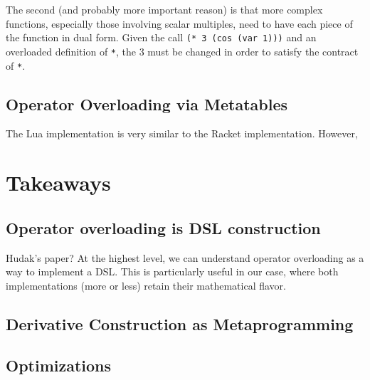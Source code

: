 \documentclass{article}
\begin{document}
The second (and probably more important reason) is that more complex functions,
especially those involving scalar multiples, need to have each piece of the
function in dual form.  Given the call \lstinline{(* 3 (cos (var 1)))} and an
overloaded definition of \lstinline{*}, the 3 must be changed in order to
satisfy the contract of \lstinline{*}.


\subsection{Operator Overloading via Metatables}
The Lua implementation is very similar to the Racket implementation.  However, 


\section{Takeaways}
\subsection{Operator overloading is DSL construction}
Hudak's paper?
At the highest level, we can understand operator overloading as a way to implement a DSL.  This is particularly useful in our case, where both implementations (more or less) retain their mathematical flavor.

\subsection{Derivative Construction as Metaprogramming}

\subsection{Optimizations}
\end{document}
